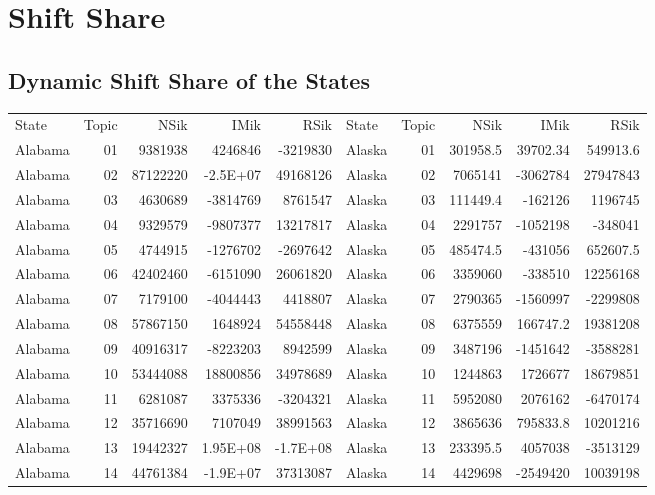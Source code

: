 \chapter{Shift Share}
\label{appendix:shiftshare}
\section{Dynamic Shift Share of the States}
\begin{table}[]
	\footnotesize
	\begin{tabular}{lrrrrlrrrr}
		State & Topic & NSik & IMik & RSik & State & Topic & NSik & IMik & RSik \\
		Alabama &  01  & 9381938 & 4246846 & -3219830 & Alaska &  01  & 301958.5 & 39702.34 & 549913.6 \\
		Alabama &  02  & 87122220 & -2.5E+07 & 49168126 & Alaska &  02  & 7065141 & -3062784 & 27947843 \\
		Alabama &  03  & 4630689 & -3814769 & 8761547 & Alaska &  03  & 111449.4 & -162126 & 1196745 \\
		Alabama &  04  & 9329579 & -9807377 & 13217817 & Alaska &  04  & 2291757 & -1052198 & -348041 \\
		Alabama &  05  & 4744915 & -1276702 & -2697642 & Alaska &  05  & 485474.5 & -431056 & 652607.5 \\
		Alabama &  06  & 42402460 & -6151090 & 26061820 & Alaska &  06  & 3359060 & -338510 & 12256168 \\
		Alabama &  07  & 7179100 & -4044443 & 4418807 & Alaska &  07  & 2790365 & -1560997 & -2299808 \\
		Alabama &  08  & 57867150 & 1648924 & 54558448 & Alaska &  08  & 6375559 & 166747.2 & 19381208 \\
		Alabama &  09  & 40916317 & -8223203 & 8942599 & Alaska &  09  & 3487196 & -1451642 & -3588281 \\
		Alabama &  10 & 53444088 & 18800856 & 34978689 & Alaska &  10 & 1244863 & 1726677 & 18679851 \\
		Alabama &  11 & 6281087 & 3375336 & -3204321 & Alaska &  11 & 5952080 & 2076162 & -6470174 \\
		Alabama &  12 & 35716690 & 7107049 & 38991563 & Alaska &  12 & 3865636 & 795833.8 & 10201216 \\
		Alabama &  13 & 19442327 & 1.95E+08 & -1.7E+08 & Alaska &  13 & 233395.5 & 4057038 & -3513129 \\
		Alabama &  14 & 44761384 & -1.9E+07 & 37313087 & Alaska &  14 & 4429698 & -2549420 & 10039198 \\

\end{tabular}
\end{table}
